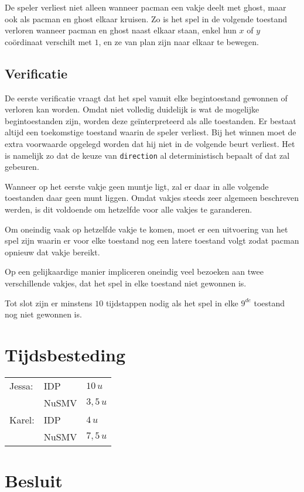 \documentclass[a4paper,12pt]{article}
\begin{document}
De speler verliest niet alleen wanneer pacman een vakje deelt met ghost,
maar ook als pacman en ghost elkaar kruisen.
Zo is het spel in de volgende toestand verloren wanneer pacman en ghost naast elkaar staan,
enkel hun $ x $ of $ y $ co\"ordinaat verschilt met $ 1 $, en ze van plan zijn naar elkaar te bewegen.

\subsection{Verificatie}
De eerste verificatie vraagt dat het spel vanuit elke begintoestand gewonnen of verloren kan worden.
Omdat niet volledig duidelijk is wat de mogelijke begintoestanden zijn,
worden deze ge\"interpreteerd als alle toestanden.
Er bestaat altijd een toekomstige toestand waarin de speler verliest.
Bij het winnen moet de extra voorwaarde opgelegd worden dat hij niet in de volgende beurt verliest.
Het is namelijk zo dat de keuze van \texttt{direction} al deterministisch bepaalt of dat zal gebeuren.

Wanneer op het eerste vakje geen muntje ligt, zal er daar in alle volgende toestanden daar geen munt liggen.
Omdat vakjes steeds zeer algemeen beschreven werden, is dit voldoende om hetzelfde voor alle vakjes te garanderen.

Om oneindig vaak op hetzelfde vakje te komen,
moet er een uitvoering van het spel zijn waarin er voor elke toestand nog een latere toestand volgt 
zodat pacman opnieuw dat vakje bereikt.

Op een gelijkaardige manier impliceren oneindig veel bezoeken aan twee verschillende vakjes,
dat het spel in elke toestand niet gewonnen is.

Tot slot zijn er minstens $ 10 $ tijdstappen nodig als het spel in elke $ 9^{de} $ toestand nog niet gewonnen is.

\section{Tijdsbesteding}
\begin{tabular}{l l l}
Jessa: 	& IDP 	& $ 10\,u $\\
		& NuSMV 	& $ 3,5\,u $\\
Karel: 	& IDP 	& $ 4\,u $\\
		& NuSMV 	& $ 7,5\,u $\\
\end{tabular}

\section{Besluit}
\end{document}
